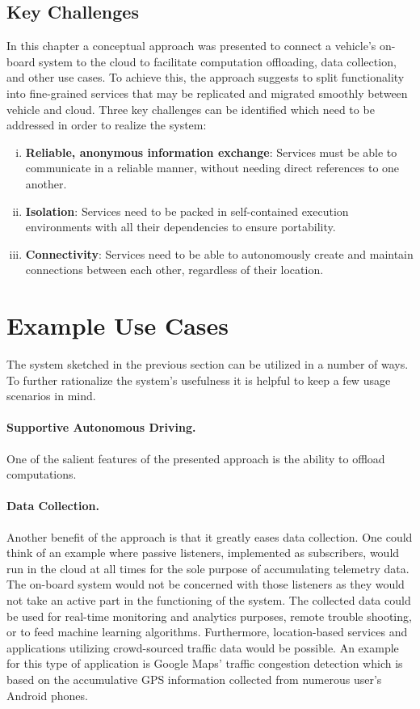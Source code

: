 \subsection{Key Challenges} 
\label{sec:challenges}
In this chapter a conceptual approach was presented to connect a vehicle's on-board system to the cloud to facilitate computation offloading, data collection, and other use cases. To achieve this, the approach suggests to split functionality into fine-grained services that may be replicated and migrated smoothly between vehicle and cloud. Three key challenges can be identified which need to be addressed in order to realize the system:

\begin{enumerate}[(i)]
\item \textbf{Reliable, anonymous information exchange}: Services must be able to communicate in a reliable manner, without needing direct references to one another.
\item \textbf{Isolation}: Services need to be packed in self-contained execution environments with all their dependencies to ensure portability.
\item \textbf{Connectivity}: Services need to be able to autonomously create and maintain connections between each other, regardless of their location.
\end{enumerate}

%
%
%
%
%
%
%
%
%
%

\section{Example Use Cases} \label{sec:usecases}
The system sketched in the previous section can be utilized in a number of ways. To further rationalize the system's usefulness it is helpful to keep a few usage scenarios in mind.

\paragraph{Supportive Autonomous Driving.}
One of the salient features of the presented approach is the ability to offload computations. 

\paragraph{Data Collection.} 
Another benefit of the approach is that it greatly eases data collection. One could think of an example where passive listeners, implemented as subscribers, would run in the cloud at all times for the sole purpose of accumulating telemetry data. The on-board system would not be concerned with those listeners as they would not take an active part in the functioning of the system. The collected data could be used for real-time monitoring and analytics purposes, remote trouble shooting, or to feed machine learning algorithms. Furthermore, location-based services and applications utilizing crowd-sourced traffic data would be possible. An example for this type of application is Google Maps' traffic congestion detection which is based on the accumulative GPS information collected from numerous user's Android phones.

